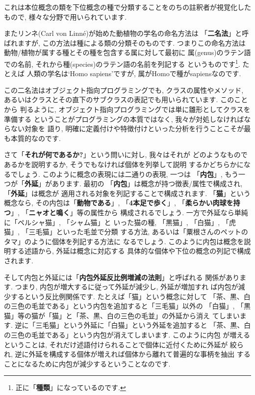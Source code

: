 \documentclass[b5j,8pt,twocolumn]{ltjsarticle}
\begin{document}
これは本位概念の類を下位概念の種で分類することをのちの註釈者が視覚化した
もので, 様々な分野で用いられています.
\newline

またリンネ(Carl von Linn\'e)が始めた動植物の学名の命名方法は
「\textbf{二名法}」と呼ばれますが, この方法は種による類の分類そのものです.
 つまりこの命名方法は動物/植物が属する種とその種を包含する属に対して最初に
属(genus)のラテン語での名前, それから種(species)のラテン語の名前を列記する
というものです\footnote{正に「\textbf{種類}」になっているのです.}. たとえば
人類の学名は`Homo sapiens'ですが, 属がHomoで種がsapiensなのです.
\newline

この二名法はオブジェクト指向プログラミングでも, クラスの属性やメソッド,
あるいはクラスとその直下のサブクラスの表記でも用いられています. このことから
判るように, オブジェクト指向プログラミングでは単に雛形としてクラスを準備する
ということがプログラミングの本質ではなく, 我々が対処しなければならない対象を
語り, 明確に定義付けや特徴付けといった分析を行うことこそが最も本質的なのです.
\newline


さて「\textbf{それが何であるか?}」という問いに対し, 我々はそれが
どのようなものであるかを説明するか, そうでもなければ個体を列挙して説明
するかどちらかになるでしょう. このように概念の表現には二通りの表現, 一つは
「\textbf{内包}」, もう一つが「\textbf{外延}」があります. 最初の
「\textbf{内包}」は概念が持つ徴表/属性で構成され,「\textbf{外延}」は概念が
適用される対象を列記することで構成されます. 「\textbf{猫}」という概念なら,
 その内包は「\textbf{動物である}」, 「\textbf{4本足で歩く}」,
 「\textbf{柔らかい肉球を持つ}」, 「\textbf{ニャオと鳴く}」等の属性から
構成されるでしょう. 一方で外延なら単純に「ペルシャ猫」, 「シャム猫」と
いった猫の種, 「黒猫」, 「白猫」, 「虎猫」, 「三毛猫」といった毛並で分類
する方法, あるいは「粟根さんのペットのタマ」のように個体を列記する方法に
なるでしょう. このように内包は概念を説明する述語から, 外延は概念に対応する
具体的な個体や下位の概念の列記で構成されます.
\newline


そして内包と外延には「\textbf{内包外延反比例増減の法則}」と呼ばれる
関係があります. つまり, 内包が増大するに従って外延が減少し, 外延が増加すれ
ば内包が減少するという反比例関係です. たとえば「猫」という概念に対して
「茶、黒、白の三色の毛並である」という内包を追加すると「三毛猫」以外の
「白猫」, 「黒猫」等の猫が「猫」と「茶、黒、白の三色の毛並」の外延から消え
てしまいます. 逆に「三毛猫」という外延に「白猫」という外延を追加すると
「茶、黒、白の三色の毛並である」という内包が消えてしまいます. このように内包
が増えるということは, それだけ述語付けられることで個体に近付くために外延が
絞られ, 逆に外延を構成する個体が増えれば個体から離れて普遍的な事柄を抽出
することになるために内包が減少するということなのです. 
\newline
\end{document}
